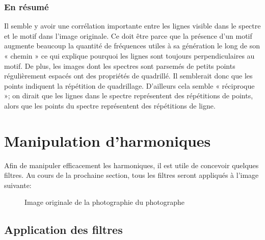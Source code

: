 \documentclass[12pt]{article}
\begin{document}
\vspace{2cm}

\subsubsection {En résumé}
Il semble y avoir une corrélation importante entre les lignes visible dans le spectre et le motif dans l'image originale. Ce doit être parce que la présence d'un motif augmente beaucoup la quantité de fréquences utiles à sa génération le long de son « chemin » ce qui explique pourquoi les lignes sont toujours perpendiculaires au motif. De plus, les images dont les spectres sont parsemés de petits points régulièrement espacés ont des propriétés de quadrillé. Il semblerait donc que les points indiquent la répétition de quadrillage. D'ailleurs cela semble « réciproque »; on dirait que les lignes dans le spectre représentent des répétitions de points, alors que les points du spectre représentent des répétitions de ligne.

\pagebreak

\section{Manipulation d'harmoniques}
Afin de manipuler efficacement les harmoniques, il est utile de concevoir quelques filtres. Au cours de la prochaine section, tous les filtres seront appliqués à l'image suivante:
\vspace{1.5cm}

\begin{figure}[ht]
  \centering
  \captionsetup{width=.8\linewidth}
  \caption{Image originale de la photographie du photographe}
\end{figure}

\vspace{.5cm}

\subsection{Application des filtres}
\end{document}
